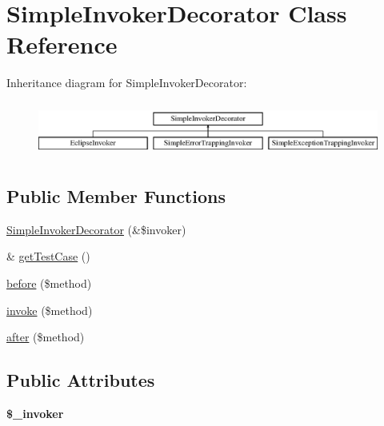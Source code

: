 \hypertarget{class_simple_invoker_decorator}{
\section{SimpleInvokerDecorator Class Reference}
\label{class_simple_invoker_decorator}
}
Inheritance diagram for SimpleInvokerDecorator:\begin{figure}[H]
\begin{center}
\leavevmode
\includegraphics[height=1.830065cm]{class_simple_invoker_decorator}
\end{center}
\end{figure}
\subsection*{Public Member Functions}
\begin{DoxyCompactItemize}
\item 
\hyperlink{class_simple_invoker_decorator_a29f5d5512d26f640e9587503269b639b}{SimpleInvokerDecorator} (\&\$invoker)
\item 
\& \hyperlink{class_simple_invoker_decorator_a621cdedf65d9a2fc0a4ce35e475a720b}{getTestCase} ()
\item 
\hyperlink{class_simple_invoker_decorator_affaed9e6d8d366064589bbcdae7a6f15}{before} (\$method)
\item 
\hyperlink{class_simple_invoker_decorator_a95431eef2d336fc92dbbc719a66cda32}{invoke} (\$method)
\item 
\hyperlink{class_simple_invoker_decorator_a7b4b69f4e499f4e15c52e57542c52d7e}{after} (\$method)
\end{DoxyCompactItemize}
\subsection*{Public Attributes}
\begin{DoxyCompactItemize}
\item 
\hypertarget{class_simple_invoker_decorator_a07f6f15a8493b6c24f481a7a0c3ebba8}{
{\bfseries \$\_\-invoker}}
\label{class_simple_invoker_decorator_a07f6f15a8493b6c24f481a7a0c3ebba8}

\end{DoxyCompactItemize}


